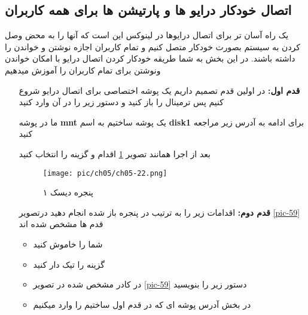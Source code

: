 \subsection{اتصال خودکار درایو ها و پارتیشن ها برای همه کاربران}\label{se-461}
یک راه آسان تر برای اتصال درایوها در لینوکس این است که آنها را به محض وصل کردن به سیستم بصورت خودکار متصل کنیم و تمام کاربران اجازه نوشتن و خواندن را داشته باشند.
در این بخش به شما طریقه خودکار کردن اتصال درایو با امکان خواندن ونوشتن برای تمام کاربران را آموزش میدهیم
\begin{enumerate}
	\item[\textbf{قدم اول:}] 
	در اولین قدم تصمیم داریم یک پوشه اختصاصی برای اتصال درایو شروع کنیم پس ترمینال را باز کنید و دستور زیر را در آن وارد کنید
	
				
	ما در پوشه 
	\textbf{mnt}			
	یک پوشه ساختیم به اسم
	\textbf{disk1}
برای ادامه به آدرس زیر مراجعه کنید
	
	
	بعد از اجرا همانند تصویر
	\ref{pic-58}
	اقدام و گزینه 
	\textbf{}
	را انتخاب کنید
	\begin{figure}[H]%
	\caption{پنجره دیسک ۱}
	\begin{center}
		\texttt{[image: pic/ch05/ch05-22.png]}
	\end{center}
	\label{pic-58}
\end{figure}
\item[\textbf{قدم دوم:}] 
اقدامات زیر را به ترتیب در پنجره باز شده انجام دهید درتصویر
\ref{pic-59}	
قدم ها مشخص شده اند
\begin{itemize}
	\item شما 
	\textbf{}
	را خاموش کنید
	\item گزینه 
	\textbf{}
را تیک دار کنید
\item در کادر مشخص شده در تصویر
\ref{pic-59}
دستور زیر را بنویسید

				
				\item در بخش 
				\textbf{}
				آدرس پوشه ای که در قدم اول ساختیم را وارد میکنیم 
				

\end{itemize}
\end{enumerate}
